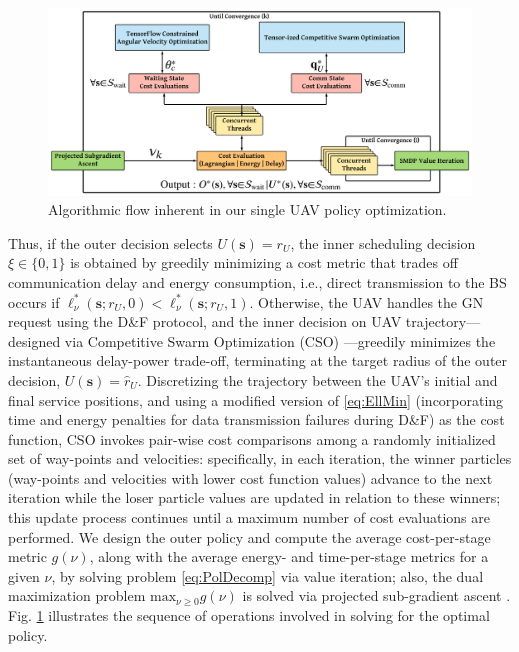 \documentclass[10pt,twocolumn]{IEEEtran}
\begin{document}
\begin{figure} [t]
    \centering
    \includegraphics[width=1.0\linewidth]{figs/Policy_Optimization_Process.png}
    \vspace{-5mm}
    \caption{Algorithmic flow inherent in our single UAV policy optimization.}
    \vspace{-7mm}
    \label{F5}
\end{figure}
\noindent Thus, if the outer decision selects $U(\mathbf{s}){=}r_{U}$, the inner scheduling decision $\xi{\in}\{0,1\}$ is obtained by greedily minimizing a cost metric that trades off communication delay and energy consumption, i.e., direct transmission to the BS occurs if $\ell_{\nu}^{*}(\mathbf{s}; r_{U},0){<}\ell_{\nu}^{*}(\mathbf{s};r_{U},1)$. Otherwise, the UAV handles the GN request using the D\&F protocol, and the inner decision on UAV trajectory---designed via Competitive Swarm Optimization (CSO) \cite{CSO}---greedily minimizes the instantaneous delay-power trade-off, terminating at the target radius of the outer decision, $U(\mathbf{s}){=}\hat{r}_{U}$. Discretizing the trajectory between the UAV's initial and final service positions, and using a modified version of \eqref{eq:EllMin} (incorporating time and energy penalties for data transmission failures during D\&F) as the cost function, CSO invokes pair-wise cost comparisons among a randomly initialized set of way-points and velocities: specifically, in each iteration, the winner particles (way-points and velocities with lower cost function values) advance to the next iteration while the loser particle values are updated in relation to these winners; this update process continues until a maximum number of cost evaluations are performed. We design the outer policy and compute the average cost-per-stage metric $g(\nu)$, along with the average energy- and time-per-stage metrics for a given $\nu$, by solving problem \eqref{eq:PolDecomp} via value iteration; also, the dual maximization problem $\mathrm{max}_{\nu{\geq}0}g(\nu)$ is solved via projected sub-gradient ascent \cite{SubgradientMethods}. Fig. \ref{F5} illustrates the sequence of operations involved in solving for the optimal policy.
\end{document}
